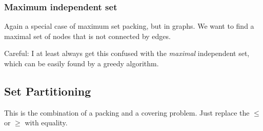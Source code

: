 \subsubsection{Maximum independent set}

Again a special case of maximum set packing, but in graphs. We want to find a maximal set of nodes that is not connected by edges.

Careful: I at least always get this confused with the \emph{maximal} independent set, which can be easily found by a greedy algorithm.
\subsection{Set Partitioning}
This is the combination of a packing and a covering problem. Just replace the $\leq$ or $\geq$ with equality.